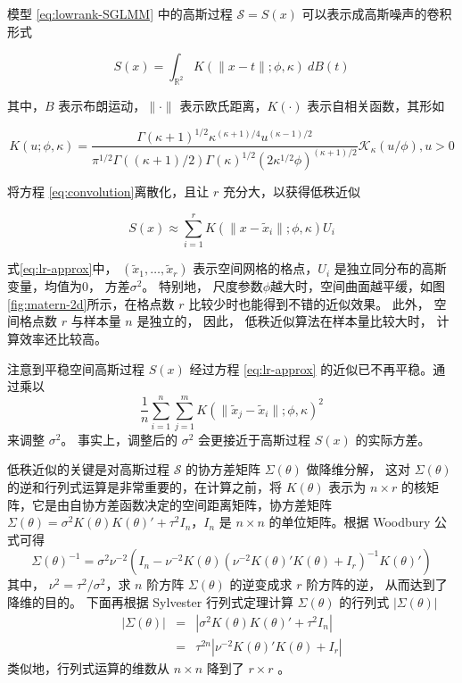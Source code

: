 \documentclass[12pt,a4paper,UTF8,twoside]{book}
\theoremstyle{definition}
\theoremstyle{definition}
\theoremstyle{definition}
\theoremstyle{remark}
\begin{document}
\noindent 模型 \eqref{eq:lowrank-SGLMM} 中的高斯过程
\(\mathcal{S} = S(x)\) 可以表示成高斯噪声的卷积形式

\begin{equation}
S(x) = \int_{\mathbb{R}^2} K(\|x-t\|; \phi, \kappa) \: d B(t) \label{eq:convolution}
\end{equation}

\noindent 其中，\(B\) 表示布朗运动，\(\|\cdot\|\)
表示欧氏距离，\(K(\cdot)\) 表示自相关函数，其形如

\begin{equation}
K(u; \phi, \kappa) = \frac{\Gamma(\kappa + 1)^{1/2}\kappa^{(\kappa+1)/4}u^{(\kappa-1)/2}}{\pi^{1/2}\Gamma((\kappa+1)/2)\Gamma(\kappa)^{1/2}(2\kappa^{1/2}\phi)^{(\kappa+1)/2}}\mathcal{K}_{\kappa}(u/\phi), u > 0 \label{eq:matern-kernel}
\end{equation}

\noindent 将方程 \eqref{eq:convolution}离散化，且让 \(r\)
充分大，以获得低秩近似 \citep{PrevMap2017JSS}

\begin{equation}
S(x) \approx \sum_{i = 1}^r K(\|x-\tilde{x}_{i}\|; \phi, \kappa) U_{i} \label{eq:lr-approx}
\end{equation}

\noindent 式\eqref{eq:lr-approx}中，
\((\tilde{x}_{1},\ldots,\tilde{x}_{r})\) 表示空间网格的格点，\(U_{i}\)
是独立同分布的高斯变量，均值为0， 方差\(\sigma^2\)。 特别地，
尺度参数\(\phi\)越大时，空间曲面越平缓，如图
\ref{fig:matern-2d}所示，在格点数 \(r\) 比较少时也能得到不错的近似效果。
此外， 空间格点数 \(r\) 与样本量 \(n\) 是独立的， 因此，
低秩近似算法在样本量比较大时， 计算效率还比较高。

注意到平稳空间高斯过程 \(S(x)\) 经过方程 \eqref{eq:lr-approx}
的近似已不再平稳。通过乘以
\[\frac{1}{n}\sum_{i = 1}^n \sum_{j = 1}^m K(\|\tilde{x}_{j}-\tilde{x}_{i}\|; \phi, \kappa)^2\]
来调整 \(\sigma^2\)。 事实上，调整后的 \(\sigma^2\) 会更接近于高斯过程
\(S(x)\) 的实际方差。

低秩近似的关键是对高斯过程 \(\mathcal{S}\) 的协方差矩阵
\(\Sigma(\theta)\) 做降维分解， 这对 \(\Sigma(\theta)\)
的逆和行列式运算是非常重要的，在计算之前，将 \(K(\theta)\) 表示为
\(n\times r\) 的核矩阵，它是由自协方差函数决定的空间距离矩阵，协方差矩阵
\(\Sigma(\theta) = \sigma^2K(\theta)K(\theta)'+\tau^2 I_{n}\)，\(I_{n}\)
是 \(n\times n\) 的单位矩阵。根据 Woodbury 公式可得
\[\Sigma(\theta)^{-1} = \sigma^2\nu^{-2}(I_{n}-\nu^{-2}K(\theta)(\nu^{-2}K(\theta)' K(\theta)+I_{r})^{-1}K(\theta)')\]
其中， \(\nu^2 = \tau^2/\sigma^2\)，求 \(n\) 阶方阵 \(\Sigma(\theta)\)
的逆变成求 \(r\) 阶方阵的逆， 从而达到了降维的目的。 下面再根据
Sylvester 行列式定理计算 \(\Sigma(\theta)\) 的行列式
\(|\Sigma(\theta)|\) \begin{eqnarray*}
|\Sigma(\theta)| & = & |\sigma^2K(\theta)K(\theta)'+\tau^2 I_{n}| \\ 
                 & = & \tau^{2n}|\nu^{-2}K(\theta)' K(\theta)+I_{r}|
\end{eqnarray*} \noindent 类似地，行列式运算的维数从 \(n\times n\)
降到了 \(r\times r\) \citep{Diggle2007}。
\end{document}
